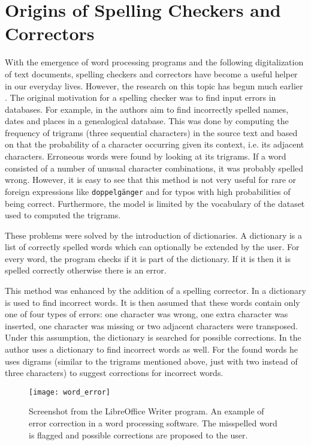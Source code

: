 \section{Origins of Spelling Checkers and Correctors}

With the emergence of word processing programs and the following digitalization of text documents, spelling checkers and correctors have become a useful helper in our everyday lives. However, the research on this topic has begun much earlier \cite{program_check_correction}. The original motivation for a spelling checker was to find input errors in databases. For example, in \cite{data_correction} the authors aim to find incorrectly spelled names, dates and places in a genealogical database. This was done by computing the frequency of trigrams (three sequential characters) in the source text and based on that the probability of a character occurring given its context, i.e. its adjacent characters. Erroneous words were found by looking at its trigrams. If a word consisted of a number of unusual character combinations, it was probably spelled wrong. However, it is easy to see that this method is not very useful for rare or foreign expressions like \texttt{doppelg\"{a}nger} and for typos with high probabilities of being correct. Furthermore, the model is limited by the vocabulary of the dataset used to computed the trigrams.

These problems were solved by the introduction of dictionaries. A dictionary is a list of correctly spelled words which can optionally be extended by the user. For every word, the program checks if it is part of the dictionary. If it is then it is spelled correctly otherwise there is an error.

This method was enhanced by the addition of a spelling corrector. In \cite{dictionary_correction} a dictionary is used to find incorrect words. It is then assumed that these words contain only one of four types of errors: one character was wrong, one extra character was inserted, one character was missing or two adjacent characters were transposed. Under this assumption, the dictionary is searched for possible corrections. In \cite{digram_correction} the author uses a dictionary to find incorrect words as well. For the found words he uses digrams (similar to the trigrams mentioned above, just with two instead of three characters) to suggest corrections for incorrect words.

\begin{figure}[t]
\centering
\texttt{[image: word\_error]}
\caption{Screenshot from the LibreOffice Writer program. An example of error correction in a word processing software. The misspelled word is flagged and possible corrections are proposed to the user.}
\label{word_correction}
\end{figure}

